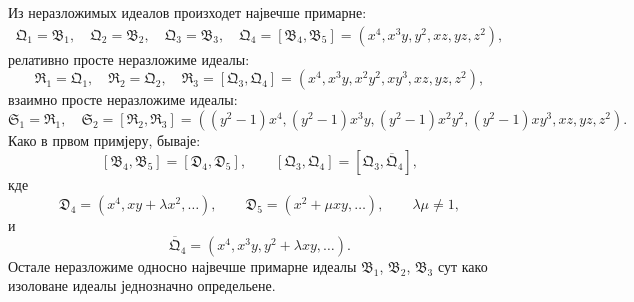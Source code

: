 ﻿\documentclass[11pt]{article}
\newcommand{\ideal}[1]{\mathfrak{#1}}
\begin{document}
Из неразложимых идеалов произходет највечше примарне:
\[
\begin{gathered}
 \ideal Q_1=\ideal B_1,
 \quad \ideal Q_2=\ideal B_2,
 \quad \ideal Q_3=\ideal B_3,
 \quad
 \ideal Q_4=[\ideal B_4,\ideal B_5]=(x^4,x^3y,y^2,xz,yz,z^2),
\end{gathered}
\]
релативно просте неразложиме идеалы:
\[
 \ideal R_1=\ideal Q_1,
 \quad \ideal R_2=\ideal Q_2,
 \quad
 \ideal R_3=[\ideal Q_3,\ideal Q_4]=(x^4,x^3y,x^2y^2,xy^3,xz,yz,z^2),
\]
взаимно просте неразложиме идеалы:
\[
 \ideal S_1=\ideal R_1,
 \quad \ideal S_2=[\ideal R_2,\ideal R_3]
 =((y^2-1)x^4,(y^2-1)x^3y,(y^2-1)x^2y^2,
 (y^2-1)xy^3,xz,yz,z^2).
\]
Како в првом примјеру, бываје:
\[
 [\ideal B_4,\ideal B_5]=[\ideal D_4,\ideal D_5],
 \qquad
 [\ideal Q_3,\ideal Q_4]=[\ideal Q_3,
\overline{\ideal Q}_4],
\]
кде
\[
 \ideal D_4=(x^4,xy+\lambda x^2,\ldots),\qquad
 \ideal D_5=(x^2+\mu xy,\ldots),\qquad \lambda\mu\ne1,
\]
и
\[
 \overline{\ideal Q}_4=(x^4,x^3y,y^2+\lambda xy,\ldots).
\]
Остале неразложиме односно највечше примарне идеалы \(\ideal B_1\), \(\ideal B_2\), \(\ideal B_3\) сут како изоловане идеалы једнозначно определьене.
\end{document}
